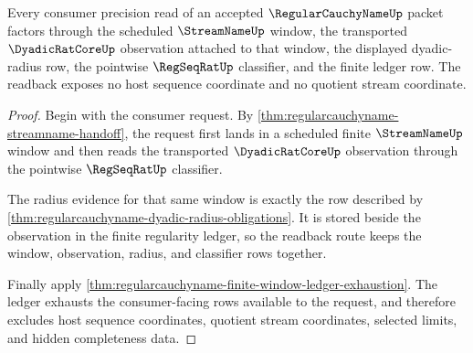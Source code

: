 \begin{theorem}
\label{thm:regularcauchyname-finite-window-readback-exactness}
Every consumer precision read of an accepted $\RegularCauchyNameUp$ packet factors through the scheduled $\StreamNameUp$ window, the transported $\DyadicRatCoreUp$ observation attached to that window, the displayed dyadic-radius row, the pointwise $\RegSeqRatUp$ classifier, and the finite ledger row. The readback exposes no host sequence coordinate and no quotient stream coordinate.
\end{theorem}
\begin{proof}
Begin with the consumer request. By \autoref{thm:regularcauchyname-streamname-handoff}, the request first lands in a scheduled finite $\StreamNameUp$ window and then reads the transported $\DyadicRatCoreUp$ observation through the pointwise $\RegSeqRatUp$ classifier.

The radius evidence for that same window is exactly the row described by \autoref{thm:regularcauchyname-dyadic-radius-obligations}. It is stored beside the observation in the finite regularity ledger, so the readback route keeps the window, observation, radius, and classifier rows together.

Finally apply \autoref{thm:regularcauchyname-finite-window-ledger-exhaustion}. The ledger exhausts the consumer-facing rows available to the request, and therefore excludes host sequence coordinates, quotient stream coordinates, selected limits, and hidden completeness data.
\end{proof}

